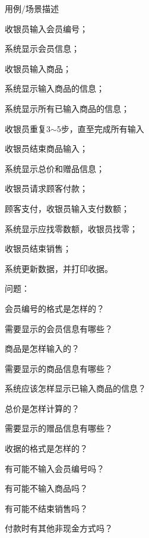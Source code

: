 {\kaishu
\begin{multicols}{2}
    用例/场景描述
    \vspace{-0.25em}
    \begin{compactenum}[1.]
        \item 收银员输入会员编号；
        \item 系统显示会员信息；
        \item 收银员输入商品；
        \item 系统显示输入商品的信息；
        \item 系统显示所有已输入商品的信息；
    \end{compactenum}
    \vspace{-0.65em}
    收银员重复3$\sim$5步，直至完成所有输入
    \vspace{-0.6em}
    \begin{compactenum}[1.]
        \setcounter{enumi}{5}
        \item 收银员结束商品输入；
        \item 系统显示总价和赠品信息；
        \item 收银员请求顾客付款；
        \item 顾客支付，收银员输入支付数额；
        \item 系统显示应找零数额，收银员找零；
        \item 收银员结束销售；
        \item 系统更新数据，并打印收据。
    \end{compactenum}

    问题：
    \vspace{-0.25em}
    \begin{compactenum}[1.]
        \item 会员编号的格式是怎样的？
        \item 需要显示的会员信息有哪些？
        \item 商品是怎样输入的？
        \item 需要显示的商品信息有哪些？
        \item 系统应该怎样显示已输入商品的信息？
        \\
        \item 总价是怎样计算的？
        \item 需要显示的赠品信息有哪些？
        \item 收据的格式是怎样的？
        \item 有可能不输入会员编号吗？
        \item 有可能不输入商品吗？
        \item 有可能不结束销售吗？
        \item 付款时有其他非现金方式吗？
    \end{compactenum}   
\end{multicols}
\vspace{-1em}}

